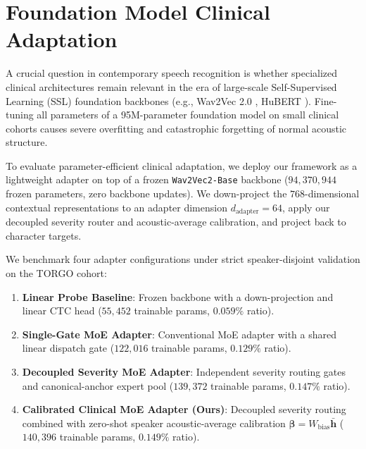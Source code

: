 \documentclass[10pt,twocolumn]{article}
\begin{document}
\section{Foundation Model Clinical Adaptation}

A crucial question in contemporary speech recognition is whether specialized clinical architectures remain relevant in the era of large-scale Self-Supervised Learning (SSL) foundation backbones (e.g., Wav2Vec 2.0 \cite{baevski2020wav2vec}, HuBERT \cite{hsu2021hubert}). Fine-tuning all parameters of a 95M-parameter foundation model on small clinical cohorts causes severe overfitting and catastrophic forgetting of normal acoustic structure.

To evaluate parameter-efficient clinical adaptation, we deploy our framework as a lightweight adapter on top of a frozen \texttt{Wav2Vec2-Base} backbone ($94,370,944$ frozen parameters, zero backbone updates). We down-project the $768$-dimensional contextual representations to an adapter dimension $d_{\text{adapter}}=64$, apply our decoupled severity router and acoustic-average calibration, and project back to character targets.

We benchmark four adapter configurations under strict speaker-disjoint validation on the TORGO cohort:
\begin{enumerate}
    \item \textbf{Linear Probe Baseline}: Frozen backbone with a down-projection and linear CTC head ($55,452$ trainable params, $0.059\%$ ratio).
    \item \textbf{Single-Gate MoE Adapter}: Conventional MoE adapter with a shared linear dispatch gate ($122,016$ trainable params, $0.129\%$ ratio).
    \item \textbf{Decoupled Severity MoE Adapter}: Independent severity routing gates and canonical-anchor expert pool ($139,372$ trainable params, $0.147\%$ ratio).
    \item \textbf{Calibrated Clinical MoE Adapter (Ours)}: Decoupled severity routing combined with zero-shot speaker acoustic-average calibration $\bm{\beta} = W_{\text{bias}}\bar{\bm{h}}$ ($140,396$ trainable params, $0.149\%$ ratio).
\end{enumerate}
\end{document}
